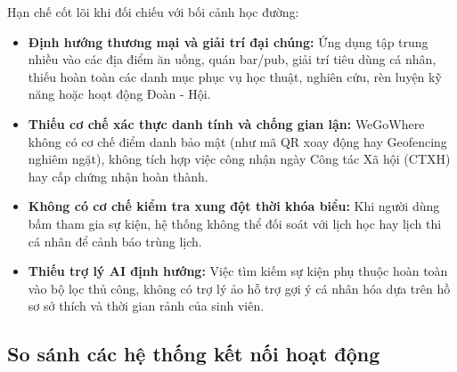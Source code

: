Hạn chế cốt lõi khi đối chiếu với bối cảnh học đường: 
\begin{itemize}
    \item \textbf{Định hướng thương mại và giải trí đại chúng:} Ứng dụng tập trung nhiều vào các địa điểm ăn uống, quán bar/pub, giải trí tiêu dùng cá nhân, thiếu hoàn toàn các danh mục phục vụ học thuật, nghiên cứu, rèn luyện kỹ năng hoặc hoạt động Đoàn - Hội.

    \item \textbf{Thiếu cơ chế xác thực danh tính và chống gian lận:} WeGoWhere không có cơ chế điểm danh bảo mật (như mã QR xoay động hay Geofencing nghiêm ngặt), không tích hợp việc công nhận ngày Công tác Xã hội (CTXH) hay cấp chứng nhận hoàn thành.
    
    \item \textbf{Không có cơ chế kiểm tra xung đột thời khóa biểu:} Khi người dùng bấm tham gia sự kiện, hệ thống không thể đối soát với lịch học hay lịch thi cá nhân để cảnh báo trùng lịch.
    
    \item \textbf{Thiếu trợ lý AI định hướng:} Việc tìm kiếm sự kiện phụ thuộc hoàn toàn vào bộ lọc thủ công, không có trợ lý ảo hỗ trợ gợi ý cá nhân hóa dựa trên hồ sơ sở thích và thời gian rảnh của sinh viên.
\end{itemize}

\subsection{So sánh các hệ thống kết nối hoạt động}

